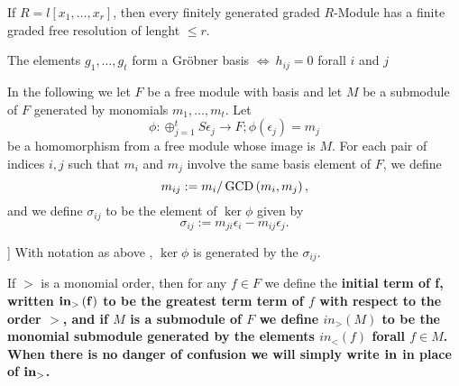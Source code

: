 \documentclass{article}
\begin{document}






\begin{thm}
	If \( R = l \left[ x_{1}, \dots ,x_{r} \right] \), 
then every finitely generated graded \( R\)-Module has a finite graded free resolution of lenght \( \le r  \).
\end{thm}



\begin{thm}
	The elements \( g_1,\dots,g_t \) form a Gr\"obner basis \( \iff \ h_{ij}=0 \) forall \( i\) and \(j\)
\end{thm}


\begin{nota}[\nocite{Eis1}]
	In the following we let
	\( F \) 
	be a free module with basis and let 
	\( M \)
	be a submodule of 
	\( F \) generated by monomials
	\( m_{1},\dots,m_{t}\).
	Let
	\[
		\phi:\oplus_{j=1}^{t} S\epsilon_{j} \to F;
		\phi\left( \epsilon_{j} \right) = m_{j}
	\]
	be a homomorphism from a free module whose image is 
	\(M \).
	For each pair of indices 
	\(i,j\)
	such that 
	\( m_{i}\)
	and 
	\( m_{j}\)
	involve the same basis element of
	\( F \),
	we define 
	\[
		m_{ij} := m_{i}/\operatorname{GCD}\left( m_{i},m_{j} \right) ,
	\]
	and we define 
	\( \sigma_{ij} \)
	to be the element of 
	\( \ker \phi \) 
	given by
	\[
		\sigma_{ij} := m_{ji}\epsilon_{i}-m_{ij}\epsilon_{j} .
	\]
\end{nota}

\begin{lem}[\cite{Eis1}[15.1]\label{syzygy_generation}]
	With notation as above %
	,
	\( \ker \phi \)
	is generated by the 
	\( \sigma_{ij}\).
\end{lem}

\begin{defn}
	If \( > \) is a monomial order, 
	then for any \( f \in F \) we define the \bf{initial term of f}, 
	written \( \bf{in}_{>}\left( f \right) \) 
	to be the greatest term term of \( f \) 
	with respect to the order \( > \), 
	and if \( M \) is a submodule of \( F\) 
	we define \( in_{>}\left( M \right) \) 
	to be the monomial submodule generated by 
	the elements \( in_{<} \left( f \right) \) 
	forall \( f \in M \). 
	When there is no danger of confusion 
	we will simply write \( \bf{in} \) in place of \( \bf{in}_{>} \).
\end{defn}
\end{document}
